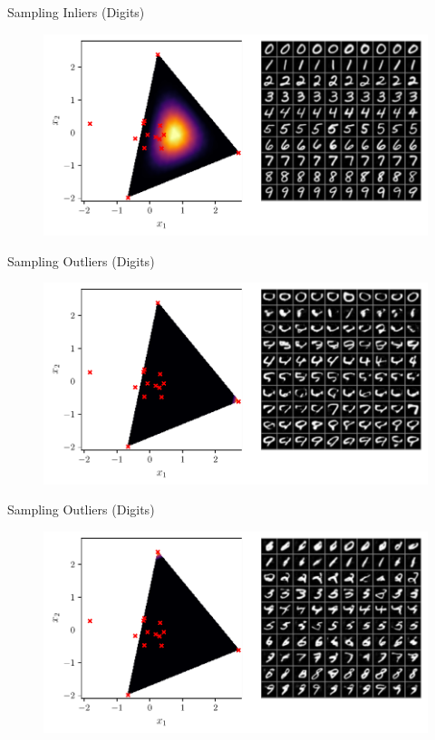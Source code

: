 \documentclass[aspectratio=169]{beamer}
\begin{document}
\begin{frame}{Sampling Inliers (Digits)}
\begin{figure}[htpb]
	\includegraphics[height=0.7\textheight]{figures/samples/aa_emnist.pdf}
\end{figure}
\end{frame}

\begin{frame}{Sampling Outliers (Digits)}
\begin{figure}[htpb]
	\includegraphics[height=0.7\textheight]{figures/samples/aa_emnist1.pdf}
\end{figure}
\end{frame}

\begin{frame}{Sampling Outliers (Digits)}
\begin{figure}[htpb]
	\includegraphics[height=0.7\textheight]{figures/samples/aa_emnist2.pdf}
\end{figure}
\end{frame}
\end{document}
